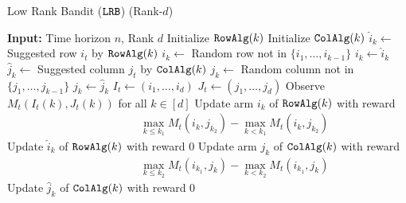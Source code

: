 \begin{algorithm}[t]
  \caption{Low Rank Bandit (${\tt LRB}$) (Rank-$d$)}
  \label{alg:LRB1}
  \begin{algorithmic}[1]
    \State \textbf{Input:} Time horizon $n$, Rank $d$
      \State Initialize ${\tt RowAlg} (k)$
      \State Initialize ${\tt ColAlg} (k)$
    \EndFor
        \State $\hat{i}_k \gets$ Suggested row $i_t$ by ${\tt RowAlg}(k)$
          \State $i_k \gets$ Random row not in $\{i_1, \dots, i_{k - 1}\}$
        \Else
          \State $i_k \gets \hat{i}_k$
        \EndIf
        \State $\hat{j}_k \gets$ Suggested column $j_t$ by ${\tt ColAlg}(k)$
          \State $j_k \gets$ Random column not in $\{j_1, \dots, j_{k - 1}\}$
        \Else
          \State $j_k \gets \hat{j}_k$
        \EndIf
      \EndFor
      \State $I_t \gets (i_1, \dots, i_d)$
      \State $J_t \gets (j_1, \dots, j_d)$
      \State Observe $M_t(I_t(k), J_t(k))$ for all $k \in [d]$
        \State Update arm $i_{k}$ of ${\tt RowAlg}(k)$ with reward
       \begin{align*}
    &\qquad \qquad \max_{k \leq k_1} M_t(i_k, j_{k_2}) - \max_{k < k_1} M_t(i_k, j_{k_2})
        \end{align*}
        \Else
          \State Update $\hat{i}_k$ of ${\tt RowAlg}(k)$ with reward $0$ 
        \EndIf
    		\State Update arm $j_{k}$ of ${\tt ColAlg}(k)$ with reward
         \begin{align*}
         &\qquad \qquad \max_{k \leq k_2} M_t(i_{k_1}, j_k)  - \max_{k < k_2} M_t(i_{k_1}, j_k)
        \end{align*}
        \Else
          \State Update $\hat{j}_k$ of ${\tt ColAlg}(k)$ with reward $0$
        \EndIf
      \EndFor
      \EndFor
     \EndFor
  \end{algorithmic}
\end{algorithm}
\vspace*{-0.8em}

